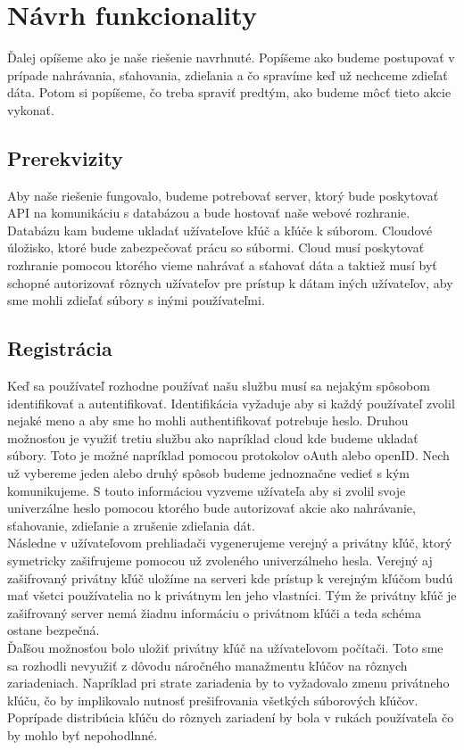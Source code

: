 \chapter{Návrh funkcionality}
	Ďalej opíšeme ako je naše riešenie navrhnuté. Popíšeme ako budeme postupovať v prípade nahrávania, sťahovania, zdieľania a čo spravíme keď už nechceme zdieľať dáta. Potom si popíšeme, čo treba spraviť predtým, ako budeme môcť tieto akcie vykonať.
	
	\section{Prerekvizity}
	
		Aby naše riešenie fungovalo, budeme potrebovať server, ktorý bude poskytovať API na komunikáciu s databázou a bude hostovať naše webové rozhranie. Databázu kam budeme ukladať užívateľove kľúč a kľúče k súborom. Cloudové úložisko, ktoré bude zabezpečovať prácu so súbormi. Cloud musí poskytovať rozhranie pomocou ktorého vieme nahrávať a sťahovať dáta a taktiež musí byť schopné autorizovať rôznych užívateľov pre prístup k dátam iných užívateľov, aby sme mohli zdieľať súbory s inými používateľmi. 
		
	\section{Registrácia}
		
		Keď sa používateľ rozhodne používať našu službu musí sa nejakým spôsobom identifikovať a autentifikovať. Identifikácia vyžaduje aby si každý používateľ zvolil nejaké meno a aby sme ho mohli authentifikovať potrebuje heslo. Druhou možnosťou je využiť tretiu službu ako napríklad cloud kde budeme ukladať súbory. Toto je možné napríklad pomocou protokolov oAuth alebo openID. Nech už vybereme jeden alebo druhý spôsob budeme jednoznačne vedieť s kým komunikujeme. S touto informáciou vyzveme užívateľa aby si zvolil svoje univerzálne heslo pomocou ktorého bude autorizovať akcie ako nahrávanie, sťahovanie, zdieľanie a zrušenie zdieľania dát.
		\\Následne v užívateľovom prehliadači vygenerujeme verejný a privátny kľúč, ktorý symetricky zašifrujeme pomocou už zvoleného univerzálneho hesla. Verejný aj zašifrovaný privátny kľúč uložíme na serveri kde prístup k verejným kľúčom budú mať všetci používatelia no k privátnym len jeho vlastníci. Tým že privátny kľúč je zašifrovaný server nemá žiadnu informáciu o privátnom kľúči a teda schéma ostane bezpečná. 
		\\Ďaľšou možnosťou bolo uložiť privátny kľúč na užívateľovom počítači. Toto sme sa rozhodli nevyužiť z dôvodu náročného manažmentu kľúčov na rôznych zariadeniach. Napríklad pri strate zariadenia by to vyžadovalo zmenu privátneho kľúču, čo by implikovalo nutnosť prešifrovania všetkých súborových kľúčov. Poprípade distribúcia kľúču do rôznych zariadení by bola v rukách používateľa čo by mohlo byť nepohodlnné.
		
